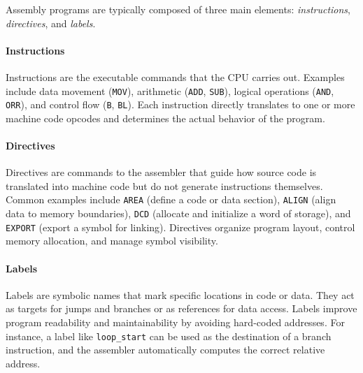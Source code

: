 Assembly programs are typically composed of three main elements: \emph{instructions}, \emph{directives}, and \emph{labels}.

\paragraph{Instructions}  
Instructions are the executable commands that the CPU carries out. Examples include data movement (\texttt{MOV}), arithmetic (\texttt{ADD}, \texttt{SUB}), logical operations (\texttt{AND}, \texttt{ORR}), and control flow (\texttt{B}, \texttt{BL}). Each instruction directly translates to one or more machine code opcodes and determines the actual behavior of the program.

\paragraph{Directives}  
Directives are commands to the assembler that guide how source code is translated into machine code but do not generate instructions themselves. Common examples include \texttt{AREA} (define a code or data section), \texttt{ALIGN} (align data to memory boundaries), \texttt{DCD} (allocate and initialize a word of storage), and \texttt{EXPORT} (export a symbol for linking). Directives organize program layout, control memory allocation, and manage symbol visibility.

\paragraph{Labels}  
Labels are symbolic names that mark specific locations in code or data. They act as targets for jumps and branches or as references for data access. Labels improve program readability and maintainability by avoiding hard-coded addresses. For instance, a label like \texttt{loop\_start} can be used as the destination of a branch instruction, and the assembler automatically computes the correct relative address.
